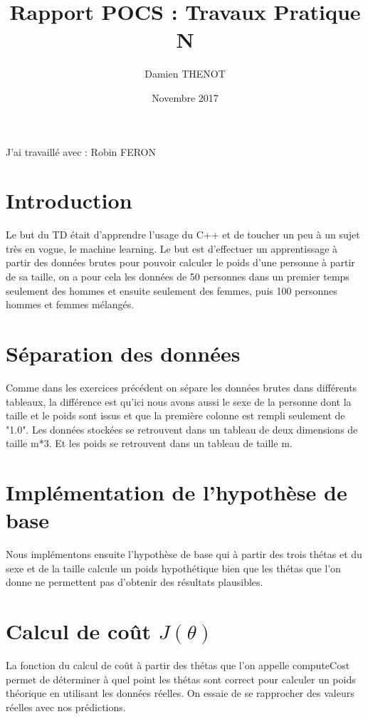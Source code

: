 \documentclass{article}
\title{Rapport POCS : Travaux Pratique N\degres1}
\author{Damien THENOT}
\date{Novembre 2017}
\begin{document}
\maketitle

\begin{center}
J'ai travaillé avec : Robin FERON
\end{center}

\section{Introduction}
Le but du TD était d'apprendre l'usage du C++ et de toucher un peu à un sujet très en vogue, le machine learning. Le but est d'effectuer un apprentissage à partir des données brutes pour pouvoir calculer le poids d'une personne à partir de sa taille, on a pour cela les données de 50 personnes dans un premier temps seulement des hommes et ensuite seulement des femmes, puis 100 personnes hommes et femmes mélangés.

\section{Séparation des données}
Comme dans les exercices précédent on sépare les données brutes dans différents tableaux, la différence est qu'ici nous avons aussi le sexe de la personne dont la taille et le poids sont issus et que la première colonne est rempli seulement de "1.0". Les données stockées se retrouvent dans un tableau de deux dimensions de taille m*3. Et les poids se retrouvent dans un tableau de taille m.

\section{Implémentation de l'hypothèse de base}
Nous implémentons ensuite l'hypothèse de base qui à partir des trois thétas et du sexe et de la taille calcule un poids hypothétique bien que les thétas que l'on donne ne permettent pas d'obtenir des résultats plausibles.

\section{Calcul de coût $J(\theta)$}
La fonction du calcul de coût à partir des thétas que l'on appelle computeCost 
permet de déterminer à quel point les thétas sont correct pour calculer un poids théorique en utilisant les données réelles. On essaie de se rapprocher des valeurs réelles avec nos prédictions.
\end{document}
